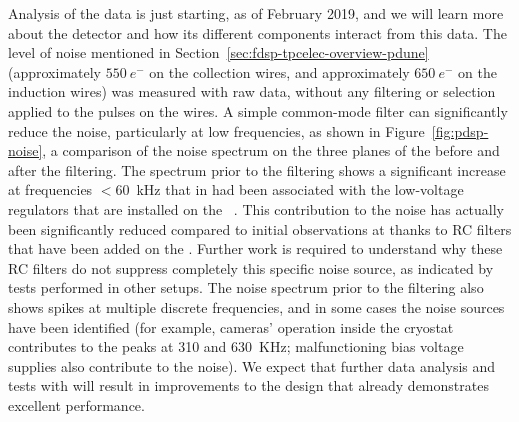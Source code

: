 Analysis of the  data is just starting, as of February 2019, and 
we will learn more about the detector and how its different components interact
from this data. The level of noise mentioned in Section~\ref{sec:fdsp-tpcelec-overview-pdune}
(approximately $\SI{550}{e^-}$ on the collection wires,
and approximately $\SI{650}{e^-}$ on the induction wires) 
was measured with raw data, without any
filtering or selection applied to the pulses on the 
wires. A simple common-mode filter can significantly reduce the 
noise, particularly at low frequencies, as shown in Figure~\ref{fig:pdsp-noise},  
a comparison of the noise spectrum on the three planes of the  
before and after the filtering. The spectrum prior to the filtering shows 
a significant increase at frequencies $<$\SI{60}{kHz} that in  
had been associated with the low-voltage regulators that are installed
on the ~\cite{Acciarri:2017sde}. This contribution to the noise 
has actually been significantly reduced compared to initial observations at 
 thanks to RC filters that have been added
on the  . Further work is required to
understand why these RC filters do not suppress completely this
specific noise source, as indicated by tests performed in other setups.
The noise spectrum prior to the filtering also shows spikes at multiple 
discrete frequencies, and in some cases the noise sources have been 
identified (for example, cameras' operation inside the cryostat
contributes to the peaks at \num{310} and \SI{630}{KHz};
malfunctioning bias voltage supplies also contribute to the noise). We 
expect that further data analysis and tests with  
will result in improvements to the  design that 
already demonstrates excellent performance.
